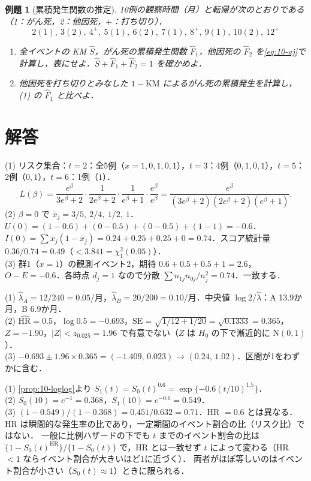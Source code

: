 \documentclass[a4paper,11pt,openany]{ltjsbook}
\newtheorem{reidai}{例題}[chapter]
\newenvironment{kaitou}[1]{%
  \par\medskip\noindent
  \begin{tcolorbox}[enhanced,breakable,colback=bkgray!3,colframe=bkgray!60,boxrule=0.4pt,
    left=4pt,right=4pt,top=2pt,bottom=2pt,arc=1pt,
    title={\cref{#1}の解答},fonttitle=\bfseries\small,coltitle=white,colbacktitle=bkgray!80]}%
  {\end{tcolorbox}\par}
\newcommand{\SE}{\mathrm{SE}}
\newcommand{\HR}{\mathrm{HR}}
\newcommand{\Normal}{\mathrm{N}}
\begin{document}
\begin{reidai}[累積発生関数の推定]\label{reidai:10-5}
10例の観察時間（月）と転帰が次のとおりである（1：がん死，2：他因死，$+$：打ち切り）．
\[
2(1),\ 3(2),\ 4^+,\ 5(1),\ 6(2),\ 7(1),\ 8^+,\ 9(1),\ 10(2),\ 12^+
\]
\begin{enumerate}[label=(\arabic*)]
\item 全イベントの KM $\hat S$，がん死の累積発生関数 $\hat F_1$，他因死の $\hat F_2$ を\cref{eq:10-aj}で計算し，表にせよ．$\hat S+\hat F_1+\hat F_2=1$ を確かめよ．
\item 他因死を打ち切りとみなした $1-\mathrm{KM}$ によるがん死の累積発生を計算し，(1) の $\hat F_1$ と比べよ．
\end{enumerate}
\end{reidai}

\section{解答}\label{sec:10-sol}
\begin{kaitou}{reidai:10-1}
(1) リスク集合：$t=2$：全5例（$x=1,0,1,0,1$），$t=3$：4例（$0,1,0,1$），$t=5$：2例（$0,1$），$t=6$：1例（$1$）．
\[
L(\beta)=\frac{e^\beta}{3e^\beta+2}\cdot\frac{1}{2e^\beta+2}\cdot\frac{1}{e^\beta+1}\cdot\frac{e^\beta}{e^\beta}
=\frac{e^\beta}{(3e^\beta+2)(2e^\beta+2)(e^\beta+1)}.
\]
(2) $\beta=0$ で $\bar x_j=3/5,\ 2/4,\ 1/2,\ 1$．$U(0)=(1-0.6)+(0-0.5)+(0-0.5)+(1-1)=-0.6$．
$I(0)=\sum\bar x_j(1-\bar x_j)=0.24+0.25+0.25+0=0.74$．スコア統計量 $0.36/0.74=0.49$（$<3.841=\chi^2_1(0.05)$）．\\
(3) 群1（$x=1$）の観測イベント2，期待 $0.6+0.5+0.5+1=2.6$，$O-E=-0.6$．各時点 $d_j=1$ なので分散 $\sum n_{1j}n_{0j}/n_j^2=0.74$．一致する．
\end{kaitou}

\begin{kaitou}{reidai:10-2}
(1) $\hat\lambda_A=12/240=0.05$/月，$\hat\lambda_B=20/200=0.10$/月．中央値 $\log2/\hat\lambda$：A 13.9か月，B 6.9か月．\\
(2) $\widehat{\HR}=0.5$，$\log0.5=-0.693$，$\SE=\sqrt{1/12+1/20}=\sqrt{0.1333}=0.365$，$Z=-1.90$，$|Z|<z_{0.025}=1.96$ で有意でない（$Z$ は $H_0$ の下で漸近的に $\Normal(0,1)$）．\\
(3) $-0.693\pm1.96\times0.365=(-1.409,\,0.023)$ → $(0.24,\,1.02)$．区間が1をわずかに含む．
\end{kaitou}

\begin{kaitou}{reidai:10-3}
(1) \cref{prop:10-loglog}より $S_1(t)=S_0(t)^{0.6}=\exp\{-0.6(t/10)^{1.5}\}$．\\
(2) $S_0(10)=e^{-1}=0.368$，$S_1(10)=e^{-0.6}=0.549$．\\
(3) $(1-0.549)/(1-0.368)=0.451/0.632=0.71$．HR $=0.6$ とは異なる．HR は瞬間的な発生率の比であり，一定期間のイベント割合の比（リスク比）ではない．
一般に比例ハザードの下でも $t$ までのイベント割合の比は $\{1-S_0(t)^{\HR}\}/\{1-S_0(t)\}$ で，HR とは一致せず $t$ によって変わる（HR $<1$ ならイベント割合が大きいほど1に近づく）．
両者がほぼ等しいのはイベント割合が小さい（$S_0(t)\approx1$）ときに限られる．
\end{kaitou}
\end{document}
